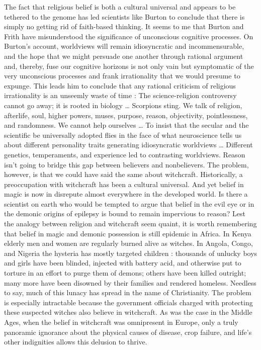 \documentclass[a4paper,14pt]{extarticle}
\begin{document}
The fact that religious belief is both a cultural universal and appears to be tethered to the genome has led scientists like Burton to conclude that there is simply no getting rid of faith-based thinking.
It seems to me that Burton and Frith have misunderstood the significance of unconscious cognitive processes.
On Burton’s account, worldviews will remain idiosyncratic and incommensurable, and the hope that we might persuade one another through rational argument and, thereby, fuse our cognitive horizons is not only vain but symptomatic of the very unconscious processes and frank irrationality that we would presume to expunge.
This leads him to conclude that any rational criticism of religious irrationality is an unseemly waste of time :
The science-religion controversy cannot go away;
it is rooted in biology \dots
Scorpions sting.
We talk of religion, afterlife, soul, higher powers, muses, purpose, reason, objectivity, pointlessness, and randomness.
We cannot help ourselves \dots
To insist that the secular and the scientific be universally adopted flies in the face of what neuroscience tells us about different personality traits generating idiosyncratic worldviews \dots
Different genetics, temperaments, and experience led to contrasting worldviews.
Reason isn’t going to bridge this gap between believers and nonbelievers.
The problem, however, is that we could have said the same about witchcraft.
Historically, a preoccupation with witchcraft has been a cultural universal.
And yet belief in magic is now in disrepute almost everywhere in the developed world.
Is there a scientist on earth who would be tempted to argue that belief in the evil eye or in the demonic origins of epilepsy is bound to remain impervious to reason?
Lest the analogy between religion and witchcraft seem quaint, it is worth remembering that belief in magic and demonic possession is still epidemic in Africa.
In Kenya elderly men and women are regularly burned alive as witches.
In Angola, Congo, and Nigeria the hysteria has mostly targeted children :
thousands of unlucky boys and girls have been blinded, injected with battery acid, and otherwise put to torture in an effort to purge them of demons;
others have been killed outright;
many more have been disowned by their families and rendered homeless.
Needless to say, much of this lunacy has spread in the name of Christianity.
The problem is especially intractable because the government officials charged with protecting these suspected witches also believe in witchcraft.
As was the case in the Middle Ages, when the belief in witchcraft was omnipresent in Europe, only a truly panoramic ignorance about the physical causes of disease, crop failure, and life’s other indignities allows this delusion to thrive.
\end{document}
